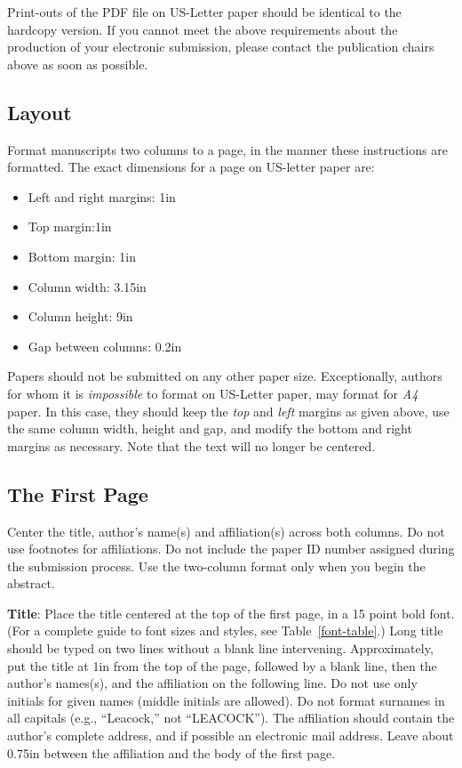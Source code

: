 \documentclass[11pt,letterpaper]{article}
\begin{document}
Print-outs of the PDF file on US-Letter paper should be identical to the
hardcopy version.  If you cannot meet the above requirements about the
production of your electronic submission, please contact the
publication chairs above  as soon as possible.


\subsection{Layout}
\label{ssec:layout}

Format manuscripts two columns to a page, in the manner these
instructions are formatted. The exact dimensions for a page on US-letter
paper are:

\begin{itemize}
\item Left and right margins: 1in
\item Top margin:1in
\item Bottom margin: 1in
\item Column width: 3.15in
\item Column height: 9in
\item Gap between columns: 0.2in
\end{itemize}

\noindent Papers should not be submitted on any other paper size. Exceptionally,
authors for whom it is \emph{impossible} to format on US-Letter paper,
may format for \emph{A4} paper. In this case, they should keep the \emph{top}
and \emph{left} margins as given above, use the same column width,
height and gap, and modify the bottom and right margins as necessary.
Note that the text will no longer be centered.

\subsection{The First Page}
\label{ssec:first}

Center the title, author's name(s) and affiliation(s) across both
columns. Do not use footnotes for affiliations.  Do not include the
paper ID number assigned during the submission process. 
Use the two-column format only when you begin the abstract.

{\bf Title}: Place the title centered at the top of the first page, in
a 15 point bold font.  (For a complete guide to font sizes and styles, see Table~\ref{font-table}.)
Long title should be typed on two lines without
a blank line intervening. Approximately, put the title at 1in from the
top of the page, followed by a blank line, then the author's names(s),
and the affiliation on the following line.  Do not use only initials
for given names (middle initials are allowed). Do not format surnames
in all capitals (e.g., ``Leacock,'' not ``LEACOCK'').  The affiliation should
contain the author's complete address, and if possible an electronic
mail address. Leave about 0.75in between the affiliation and the body
of the first page.
\end{document}
